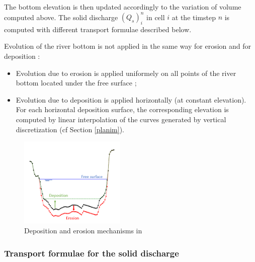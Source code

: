 
The bottom elevation is then updated accordingly to the variation of volume computed above. The solid discharge $(Q_s)_{i}^n$ in cell $i$ at the timstep $n$ is computed with different transport formulae described below. 


Evolution of the river bottom is not applied in the same way for erosion and for deposition :
\begin{itemize}
 \item Evolution due to erosion is applied uniformely on all points of the river bottom located under the free surface ;
 \item Evolution due to deposition is applied horizontally (at constant elevation). For each horizontal deposition surface, the corresponding elevation is computed by linear interpolation of the curves generated by vertical discretization (cf Section \ref{planim}).
\end{itemize}

\begin{figure}[htb!]
    \centering
    \includegraphics[width=0.45\textwidth]{./graphics/erosion_deposition.png}
    \caption{Deposition and erosion mechanisms in \Cbedload}
    \label{fig:depo_ero}
\end{figure}

\subsubsection{Transport formulae for the solid discharge}

